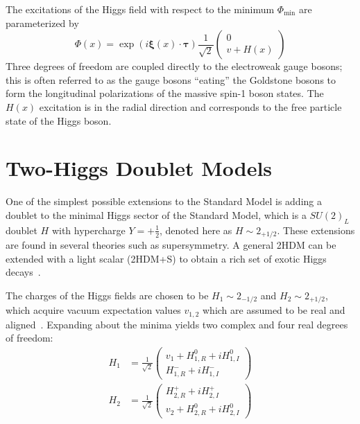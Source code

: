 The excitations of the Higgs field with respect to the minimum $\Phi_{\text{min}}$ are parameterized by 
\begin{equation}
    \Phi(x) = \exp(i \boldsymbol{\xi}(x) \cdot \boldsymbol{\tau}) \frac{1}{\sqrt{2}} \begin{pmatrix} 0 \\ v + H(x) \end{pmatrix}
\end{equation}
Three degrees of freedom are coupled directly to the electroweak gauge bosons; this is often referred to as the gauge bosons ``eating'' the Goldstone bosons to form the longitudinal polarizations of the massive spin-1 boson states. The $H(x)$ excitation is in the radial direction and corresponds to the free particle state of the Higgs boson. 

\section{Two-Higgs Doublet Models}
\label{section:theory-2HDM}

One of the simplest possible extensions to the Standard Model is adding a doublet to the minimal Higgs sector of the Standard Model, which is a $SU(2)_L$ doublet $H$ with hypercharge $Y = +\frac{1}{2}$, denoted here as $H \sim 2_{+1/2}$. These extensions are found in several theories such as supersymmetry. A general 2HDM can be extended with a light scalar (2HDM+S) to obtain a rich set of exotic Higgs decays~\cite{2HDM-PhysRevD.90.075004}. 

The charges of the Higgs fields are chosen to be $H_1 \sim 2_{-1/2}$ and $H_2 \sim 2_{+1/2}$, which acquire vacuum expectation values $v_{1,2}$ which are assumed to be real and aligned~\cite{2HDM-PhysRevD.90.075004}. Expanding about the minima yields two complex and four real degrees of freedom:
\begin{align}
    H_1 &= \frac{1}{\sqrt{2}} \begin{pmatrix} v_1 + H^{0}_{1, R} + iH^0_{1, I} \\  
                                              H^-_{1,R} + i H^-_{1, I}   \end{pmatrix} \\
    H_2 &= \frac{1}{\sqrt{2}} \begin{pmatrix} H^+_{2, R} + iH^+_{2, I} \\  
                                              v_2 + H^0_{2,R} + i H^0_{2, I}   \end{pmatrix} 
\end{align}

